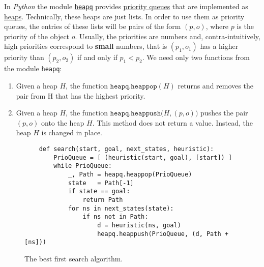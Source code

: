 In \textsl{Python} the module \href{https://docs.python.org/3.7/library/heapq.html}{\texttt{heapq}} provides 
\href{https://en.wikipedia.org/wiki/Priority_queue}{priority queues} that are implemented as 
\href{https://en.wikipedia.org/wiki/Heap_(data_structure)}{heaps}. 
Technically, these heaps are just lists.  In order to use them as priority queues, the entries of these lists
will be pairs of the form $(p, o)$, where $p$ is the priority of the object $o$.  Usually, the priorities are
numbers and, contra-intuitively, high priorities correspond to \textbf{small} numbers, that is $(p_1, o_1)$ has
a higher priority than $(p_2, o_2)$ if and only if $p_1 < p_2$. 
We need only two functions from the module \texttt{heapq}:
\begin{enumerate}
\item Given a heap $H$, the function $\texttt{heapq.heappop}(H)$ returns and removes the pair
      from H that has the highest priority.  
\item Given a heap $H$, the function $\texttt{heapq.heappush}\bigl(H, (p, o)\bigr)$  
      pushes the pair $(p, o)$ onto the heap $H$.  This method does not return a 
      value.  Instead, the heap $H$ is changed in place.
\end{enumerate}


\begin{figure}[!ht]
\centering
\begin{verbatim}
    def search(start, goal, next_states, heuristic):
        PrioQueue = [ (heuristic(start, goal), [start]) ]
        while PrioQueue:
            _, Path = heapq.heappop(PrioQueue)
            state   = Path[-1]
            if state == goal:
                return Path
            for ns in next_states(state):
                if ns not in Path:
                    d = heuristic(ns, goal)
                    heapq.heappush(PrioQueue, (d, Path + [ns]))
\end{verbatim}
\vspace*{-0.3cm}
\caption{The best first search algorithm.}
\label{fig:Best-First-Search.ipynb}
\end{figure}

